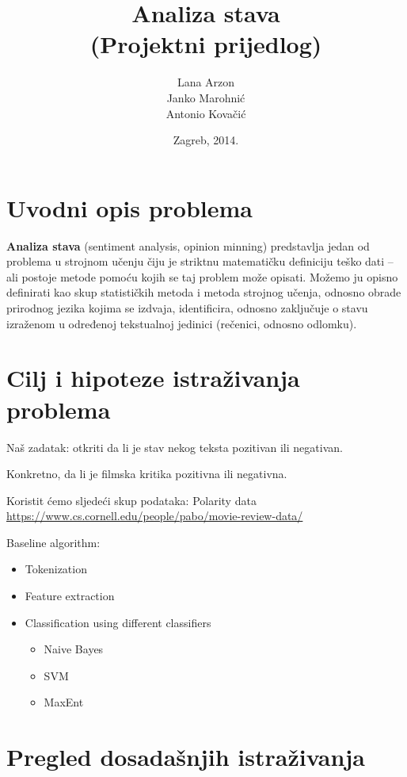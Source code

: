 \documentclass[12pt,a4paper,titlepage]{article}
\title{Analiza stava\\(Projektni prijedlog)}
\author{Lana Arzon\\Janko Marohnić\\Antonio Kovačić}
\date{Zagreb, 2014.}
\begin{document}
\maketitle

\tableofcontents

\newpage

\section{Uvodni opis problema}

\textbf{Analiza stava} (sentiment analysis, opinion minning) predstavlja jedan od problema u strojnom učenju čiju je striktnu matematičku definiciju teško dati -- ali postoje metode pomoću kojih se taj problem može opisati. Možemo ju opisno definirati kao skup statističkih metoda i metoda strojnog učenja, odnosno obrade prirodnog jezika kojima se izdvaja, identificira, odnosno zaključuje o stavu izraženom u određenoj tekstualnoj jedinici (rečenici, odnosno odlomku). 

\section{Cilj i hipoteze istraživanja problema}

Naš zadatak: otkriti da li je stav nekog teksta pozitivan ili negativan.

Konkretno, da li je filmska kritika pozitivna ili negativna.

Koristit ćemo sljedeći skup podataka: Polarity data \\
\url{https://www.cs.cornell.edu/people/pabo/movie-review-data/}

Baseline algorithm:

\begin{itemize}
	\item Tokenization
	\item Feature extraction
	\item Classification using different classifiers
	\begin{itemize}
		\item Naive Bayes
		\item SVM
		\item MaxEnt
	\end{itemize}
\end{itemize}

\section{Pregled dosadašnjih istraživanja}
\end{document}

